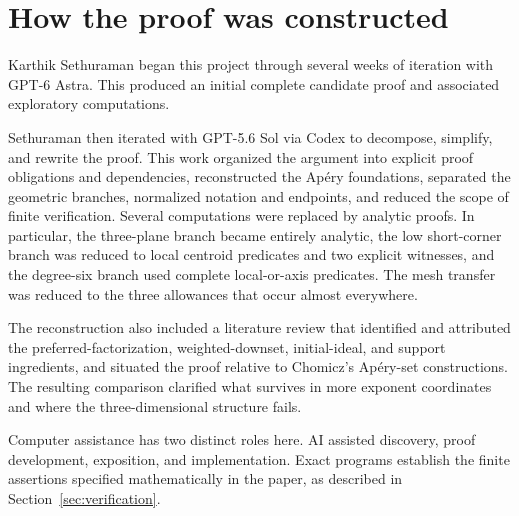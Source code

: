 \section{How the proof was constructed}\label{sec:construction}

Karthik Sethuraman began this project through several weeks of iteration
with GPT-6 Astra. This produced an initial complete candidate proof and
associated exploratory computations.

Sethuraman then iterated with GPT-5.6 Sol via Codex to decompose, simplify,
and rewrite the proof. This work organized the argument into explicit proof
obligations and dependencies, reconstructed the Ap\'ery foundations,
separated the geometric branches, normalized notation and endpoints, and
reduced the scope of finite verification. Several computations were replaced
by analytic proofs. In particular, the three-plane branch became entirely
analytic, the low short-corner branch was reduced to local centroid predicates
and two explicit witnesses, and the degree-six branch used complete
local-or-axis predicates. The mesh transfer was reduced to the three
allowances that occur almost everywhere.

The reconstruction also included a literature review that identified and
attributed the preferred-factorization, weighted-downset, initial-ideal, and
support ingredients, and situated the proof relative to Chomicz's Ap\'ery-set
constructions. The resulting comparison clarified what survives in more
exponent coordinates and where the three-dimensional structure fails.

Computer assistance has two distinct roles here. AI assisted discovery,
proof development, exposition, and implementation. Exact programs establish
the finite assertions specified mathematically in the paper, as described in
Section~\ref{sec:verification}.
